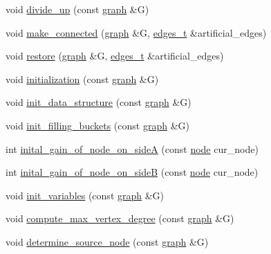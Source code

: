 \begin{DoxyCompactItemize}
\item 
void \mbox{\hyperlink{classratio__cut__partition_a04bea9656188ed01612106d797d1fd47}{divide\+\_\+up}} (const \mbox{\hyperlink{classgraph}{graph}} \&G)
\item 
void \mbox{\hyperlink{classratio__cut__partition_a46dba3eabbf31ce9d3545ba67fba1b62}{make\+\_\+connected}} (\mbox{\hyperlink{classgraph}{graph}} \&G, \mbox{\hyperlink{edge_8h_a8f9587479bda6cf612c103494b3858e3}{edges\+\_\+t}} \&artificial\+\_\+edges)
\item 
void \mbox{\hyperlink{classratio__cut__partition_a0908d7b80b86fbc10ce94655abee5478}{restore}} (\mbox{\hyperlink{classgraph}{graph}} \&G, \mbox{\hyperlink{edge_8h_a8f9587479bda6cf612c103494b3858e3}{edges\+\_\+t}} \&artificial\+\_\+edges)
\item 
void \mbox{\hyperlink{classratio__cut__partition_af4723810ece28284c79001b9ccf42ca4}{initialization}} (const \mbox{\hyperlink{classgraph}{graph}} \&G)
\item 
void \mbox{\hyperlink{classratio__cut__partition_a53b8ad2845ed39cc2677721c747bdce6}{init\+\_\+data\+\_\+structure}} (const \mbox{\hyperlink{classgraph}{graph}} \&G)
\item 
void \mbox{\hyperlink{classratio__cut__partition_a19fc538dbdaf8b1e0810a5bcde348c38}{init\+\_\+filling\+\_\+buckets}} (const \mbox{\hyperlink{classgraph}{graph}} \&G)
\item 
int \mbox{\hyperlink{classratio__cut__partition_a0f2caf60f5a9be58c983c84655537d51}{inital\+\_\+gain\+\_\+of\+\_\+node\+\_\+on\+\_\+sideA}} (const \mbox{\hyperlink{classnode}{node}} cur\+\_\+node)
\item 
int \mbox{\hyperlink{classratio__cut__partition_ab1c602d2c984844f9fe51c4a889327c4}{inital\+\_\+gain\+\_\+of\+\_\+node\+\_\+on\+\_\+sideB}} (const \mbox{\hyperlink{classnode}{node}} cur\+\_\+node)
\item 
void \mbox{\hyperlink{classratio__cut__partition_ab3054dcfbcd012aba57218fa6d0c471b}{init\+\_\+variables}} (const \mbox{\hyperlink{classgraph}{graph}} \&G)
\item 
void \mbox{\hyperlink{classratio__cut__partition_af83d8fc26a0836f4852af5f1db1aff5b}{compute\+\_\+max\+\_\+vertex\+\_\+degree}} (const \mbox{\hyperlink{classgraph}{graph}} \&G)
\item 
void \mbox{\hyperlink{classratio__cut__partition_a7d3397f85318f781fbae287037e0ae33}{determine\+\_\+source\+\_\+node}} (const \mbox{\hyperlink{classgraph}{graph}} \&G)
\item 

\end{DoxyCompactItemize}
